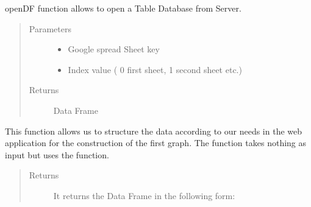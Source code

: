 \documentclass[letterpaper,10pt,english]{sphinxmanual}
\begin{document}
\begin{fulllineitems}
\label{\detokenize{read_write_google_API:openDF}}
\sphinxAtStartPar
openDF function allows to open a Table Database from Server.
\begin{quote}\begin{description}
\item[{Parameters}] \leavevmode\begin{itemize}
\item {} 
\sphinxAtStartPar
{} \textendash{} Google spread Sheet key

\item {} 
\sphinxAtStartPar
{} \textendash{} Index value ( 0 \sphinxhyphen{} first sheet,   1 \sphinxhyphen{} second sheet etc.)

\end{itemize}

\item[{Returns}] \leavevmode
\sphinxAtStartPar
Data Frame

\end{description}\end{quote}

\end{fulllineitems}


\begin{fulllineitems}
\label{\detokenize{read_write_google_API:SortH2MDistributionData}}
\sphinxAtStartPar
This function allows us to structure the data according to our needs in the web application for the construction of the first graph.
The function takes nothing as input but uses the  function.
\begin{quote}\begin{description}
\item[{Returns}] \leavevmode
\sphinxAtStartPar
It returns the Data Frame in the following form:

\end{description}\end{quote}

\sphinxAtStartPar
{}

\end{fulllineitems}
\end{document}
